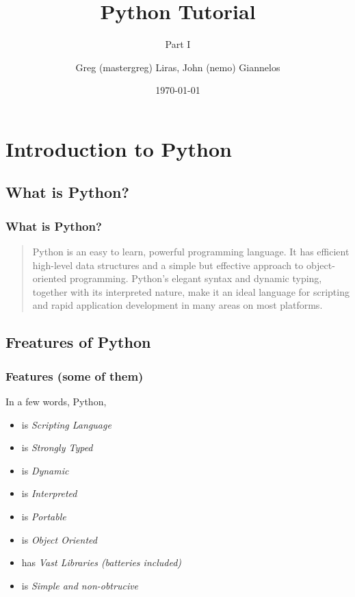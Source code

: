 \documentclass{beamer}
\author[nemo,mastergreg]{Greg (mastergreg) Liras, John (nemo) Giannelos}
\institute{foss.ntua}
\title{Python Tutorial}
\subtitle{Part I}
\date{\today}
\begin{document}
\begin{frame}
    \titlepage
\end{frame}


\section{Introduction to Python}

\subsection{What is Python?}
\begin{frame}
    \frametitle{What is Python?}
    \begin{quote}
        Python is an easy to learn, powerful programming language. It has efficient
        high-level data structures and a simple but effective approach to
        object-oriented programming. Python’s elegant syntax and dynamic typing,
        together with its interpreted nature, make it an ideal language for scripting
        and rapid application development in many areas on most platforms.
    \end{quote}
\end{frame}

\subsection{Freatures of Python}
\begin{frame}
    \frametitle{Features (some of them)}

    In a few words, Python,
    \begin{itemize}
        \item<1-> is \emph{Scripting Language}
        \item<2-> is \emph{Strongly Typed}
        \item<3-> is \emph{Dynamic}
        \item<4-> is \emph{Interpreted}
        \item<5-> is \emph{Portable}
        \item<6-> is \emph{Object Oriented}
        \item<7-> has \emph{Vast Libraries (batteries included)}
        \item<8-> is \emph{Simple and non-obtrucive}
    \end{itemize}

\end{frame}
\end{document}
